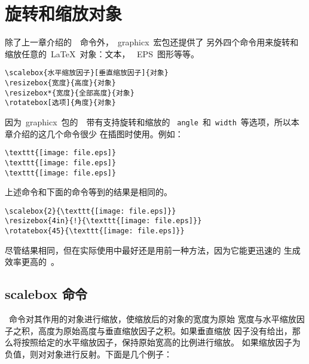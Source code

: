 \section{旋转和缩放对象}\label{sec:scalerotate}

除了上一章介绍的~~命令外，~\textsf{graphicx}~宏包还提供了
另外四个命令用来旋转和缩放任意的~\LaTeX{}~对象：{文本，
	~EPS~图形等等。}

\begin{Verbatim}[xleftmargin=1cm, formatcom=\CJKfamily{kai}\color{blue}]
\scalebox{水平缩放因子}[垂直缩放因子]{对象}
\resizebox{宽度}{高度}{对象}
\resizebox*{宽度}{全部高度}{对象}
\rotatebox[选项]{角度}{对象}
\end{Verbatim}

因为~\textsf{graphicx}~包的~~带有支持旋转和缩放的
~\texttt{angle}~和~\texttt{width}~等选项，所以本章介绍的这几个命令很少
在插图时使用。例如：
\begin{Verbatim}[xleftmargin=1cm]
\texttt{[image: file.eps]}
\texttt{[image: file.eps]}
\texttt{[image: file.eps]}
\end{Verbatim}
上述命令和下面的命令等到的结果是相同的。
\begin{Verbatim}[xleftmargin=1cm]
\scalebox{2}{\texttt{[image: file.eps]}}
\resizebox{4in}{!}{\texttt{[image: file.eps]}}
\rotatebox{45}{\texttt{[image: file.eps]}}
\end{Verbatim}

尽管结果相同，但在实际使用中最好还是用前一种方法，因为它能更迅速的
生成效率更高的~\PS。

\clearpage

\subsection{scalebox 命令}\label{ssec:scalebox}

{\large\hspace{1cm}
	}

~命令对其作用的对象进行缩放，使缩放后的对象的宽度为原始
宽度与水平缩放因子之积，高度为原始高度与垂直缩放因子之积。如果垂直缩放
因子没有给出，那么将按照给定的水平缩放因子，保持原始宽高的比例进行缩放。
如果缩放因子为负值，则对对象进行反射。下面是几个例子：


